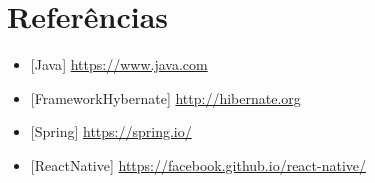 \documentclass{article}
\begin{document}
\hypertarget{_refer_ncias}{%
\section{Referências}\label{_refer_ncias}}

\begin{itemize}
\item
  {[}Java{]} \url{https://www.java.com}
\item
  {[}FrameworkHybernate{]} \url{http://hibernate.org}
\item
  {[}Spring{]} \url{https://spring.io/}
\item
  {[}ReactNative{]} \url{https://facebook.github.io/react-native/}
\end{itemize}
\end{document}
